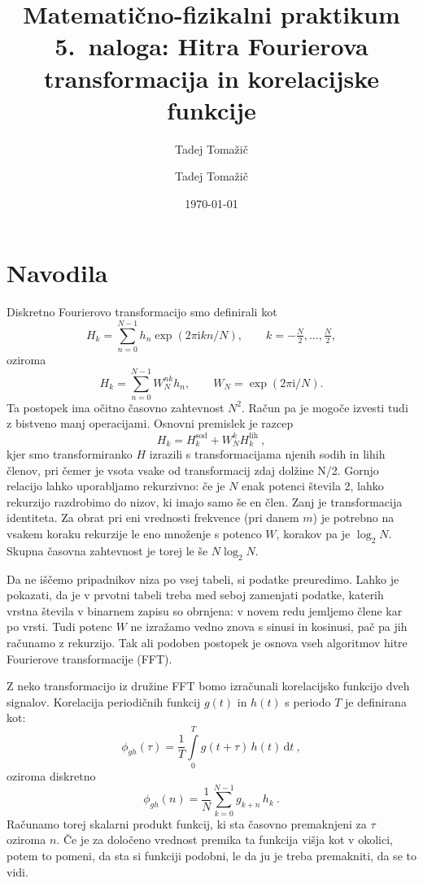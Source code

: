 \documentclass[slovene,11pt,a4paper]{article}
\title{
\sc\large Matematično-fizikalni praktikum \thisyear\\
\bigskip
\bf\Large 5.~naloga: Hitra Fourierova transformacija in korelacijske funkcije
}
\author{Tadej Tomažič}
\date{}
\newcommand{\dd}{\,\mathrm{d}}
\newcommand{\ii}{\mathrm{i}}
\begin{document}
\author{Tadej Tomažič}
\date{\today}

\maketitle

\newpage
{}
\tableofcontents
\listoffigures
\newpage
\section{Navodila}

Diskretno Fourierovo transformacijo smo definirali kot
\begin{equation*}
H_k = \sum_{n=0}^{N-1}
h_n \exp(2 \pi \ii k n / N),
\qquad k=-\tfrac{N}{2},\dots ,\tfrac{N}{2},
\end{equation*}
oziroma
\begin{equation*}
H_k = \sum_{n=0}^{N-1} W_N^{nk} h_n,
\qquad W_N = \exp(2 \pi \ii / N).
\end{equation*}
Ta postopek ima očitno časovno zahtevnost $N^2$. Račun pa je
mogoče izvesti tudi z bistveno manj operacijami. Osnovni premislek
je razcep
\begin{equation*}
H_k = H_{k}^\mathrm{sod} + W_N^k H_{k}^\mathrm{lih} \>,  
\end{equation*}
kjer smo transformiranko $H$ izrazili s transformacijama njenih
sodih in lihih členov, pri čemer je vsota vsake od transformacij zdaj dolžine N/2.
 Gornjo relacijo lahko uporabljamo rekurzivno:
če je $N$ enak potenci števila 2, lahko rekurzijo razdrobimo
do nizov, ki imajo samo še en člen. Zanj je transformacija
identiteta. Za obrat pri eni vrednosti frekvence (pri danem $m$)
je potrebno na vsakem koraku rekurzije le eno množenje s potenco
$W$, korakov pa je $\log_2 N$.  Skupna časovna zahtevnost je torej
le še $N\log_2 N$.

Da ne iščemo pripadnikov niza po vsej tabeli, si podatke
preuredimo. Lahko je pokazati, da je v prvotni tabeli treba med
seboj zamenjati podatke, katerih vrstna števila v binarnem zapisu
so obrnjena: v novem redu jemljemo člene kar po vrsti. Tudi
potenc $W$ ne izražamo vedno znova s sinusi in kosinusi,
pač pa jih računamo z rekurzijo.  Tak ali podoben postopek
je osnova vseh algoritmov hitre Fourierove transformacije (FFT).

Z neko transformacijo iz družine FFT bomo izračunali korelacijsko
funkcijo dveh signalov. Korelacija periodičnih funk\-cij $g(t)$ in $h(t)$
s periodo $T$ je definirana kot:
\begin{equation*}
\phi_{gh}(\tau)=\frac{1}{T}\int\limits_0^{T} g(t+\tau)\,h(t)\dd t \>,  
\end{equation*}
oziroma diskretno
\begin{equation*}
  \phi_{gh}(n)= \frac{1}{N}\sum_{k=0}^{N-1} g_{k+n}\, h_k \>.
\end{equation*}
Računamo torej skalarni produkt funkcij, ki sta časovno premaknjeni
za $\tau$ oziroma $n$. Če je za določeno vrednost premika ta
funkcija višja kot v okolici, potem to pomeni, da sta si funkciji
podobni, le da ju je treba premakniti, da se to vidi.
\end{document}
